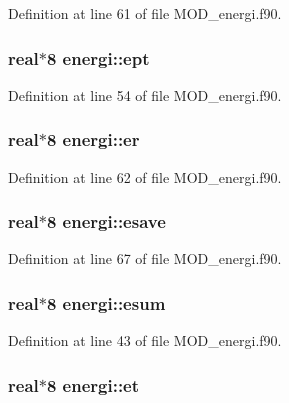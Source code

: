 Definition at line 61 of file M\-O\-D\-\_\-energi.\-f90.

\hypertarget{classenergi_ab56489e1e3639b219efef8f1004b0eab}{
\subsubsection[{ept}]{\setlength{\rightskip}{0pt plus 5cm}real$\ast$8 energi\-::ept}}\label{classenergi_ab56489e1e3639b219efef8f1004b0eab}


Definition at line 54 of file M\-O\-D\-\_\-energi.\-f90.

\hypertarget{classenergi_a00095477515fd739e083babc19b047ec}{
\subsubsection[{er}]{\setlength{\rightskip}{0pt plus 5cm}real$\ast$8 energi\-::er}}\label{classenergi_a00095477515fd739e083babc19b047ec}


Definition at line 62 of file M\-O\-D\-\_\-energi.\-f90.

\hypertarget{classenergi_a01162e5eecaf58dcbc7b5ffb269aa1e4}{
\subsubsection[{esave}]{\setlength{\rightskip}{0pt plus 5cm}real$\ast$8 energi\-::esave}}\label{classenergi_a01162e5eecaf58dcbc7b5ffb269aa1e4}


Definition at line 67 of file M\-O\-D\-\_\-energi.\-f90.

\hypertarget{classenergi_aa8b52e0fd2c978dbcdfcea144ea4bdc5}{
\subsubsection[{esum}]{\setlength{\rightskip}{0pt plus 5cm}real$\ast$8 energi\-::esum}}\label{classenergi_aa8b52e0fd2c978dbcdfcea144ea4bdc5}


Definition at line 43 of file M\-O\-D\-\_\-energi.\-f90.

\hypertarget{classenergi_a04950f69c0e2a524732bfd127da6de72}{
\subsubsection[{et}]{\setlength{\rightskip}{0pt plus 5cm}real$\ast$8 energi\-::et}}\label{classenergi_a04950f69c0e2a524732bfd127da6de72}


